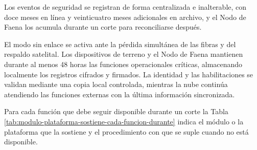 \documentclass[subdoc]{../../comun/overfore}
\begin{document}
Los eventos de seguridad se registran de forma centralizada e inalterable, con doce meses en línea y veinticuatro meses adicionales en archivo, y el Nodo de Faena los acumula durante un corte para reconciliarse después.

El modo sin enlace se activa ante la pérdida simultánea de las fibras y del respaldo satelital. Los dispositivos de terreno y el Nodo de Faena mantienen durante al menos 48 horas las funciones operacionales críticas, almacenando localmente los registros cifrados y firmados. La identidad y las habilitaciones se validan mediante una copia local controlada, mientras la nube continúa atendiendo las funciones externas con la última información sincronizada.

Para cada función que debe seguir disponible durante un corte la Tabla \ref{tab:modulo-plataforma-sostiene-cada-funcion-durante} indica el módulo o la plataforma que la sostiene y el procedimiento con que se suple cuando no está disponible.
\end{document}
